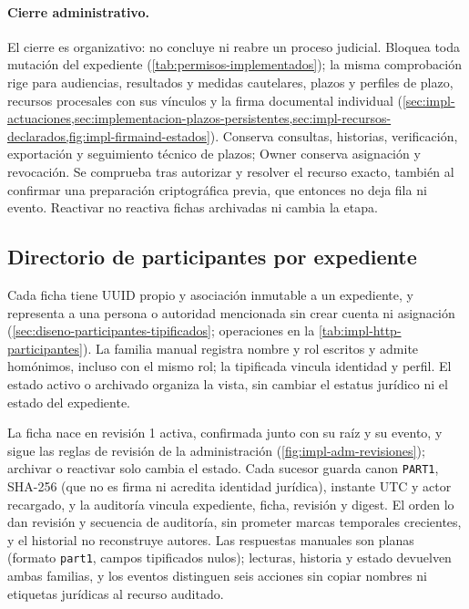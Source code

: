 \paragraph{Cierre administrativo.} El cierre es organizativo: no concluye ni reabre un proceso judicial. Bloquea toda mutación del expediente (\cref{tab:permisos-implementados}); la misma comprobación rige para audiencias, resultados y medidas cautelares, plazos y perfiles de plazo, recursos procesales con sus vínculos y la firma documental individual (\cref{sec:impl-actuaciones,sec:implementacion-plazos-persistentes,sec:impl-recursos-declarados,fig:impl-firmaind-estados}). Conserva consultas, historias, verificación, exportación y seguimiento técnico de plazos; Owner conserva asignación y revocación. Se comprueba tras autorizar y resolver el recurso exacto, también al confirmar una preparación criptográfica previa, que entonces no deja fila ni evento. Reactivar no reactiva fichas archivadas ni cambia la etapa.

\subsection{Directorio de participantes por expediente}\label{sec:impl-http-participantes}

Cada ficha tiene UUID propio y asociación inmutable a un expediente, y representa a una persona o autoridad mencionada sin crear cuenta ni asignación (\cref{sec:diseno-participantes-tipificados}; operaciones en la \cref{tab:impl-http-participantes}). La familia manual registra nombre y rol escritos y admite homónimos, incluso con el mismo rol; la tipificada vincula identidad y perfil. El estado activo o archivado organiza la vista, sin cambiar el estatus jurídico ni el estado del expediente.

La ficha nace en revisión 1 activa, confirmada junto con su raíz y su evento, y sigue las reglas de revisión de la administración (\cref{fig:impl-adm-revisiones}); archivar o reactivar solo cambia el estado. Cada sucesor guarda canon \texttt{PART1}, SHA-256 (que no es firma ni acredita identidad jurídica), instante UTC y actor recargado, y la auditoría vincula expediente, ficha, revisión y digest. El orden lo dan revisión y secuencia de auditoría, sin prometer marcas temporales crecientes, y el historial no reconstruye autores. Las respuestas manuales son planas (formato \texttt{part1}, campos tipificados nulos); lecturas, historia y estado devuelven ambas familias, y los eventos distinguen seis acciones sin copiar nombres ni etiquetas jurídicas al recurso auditado.

